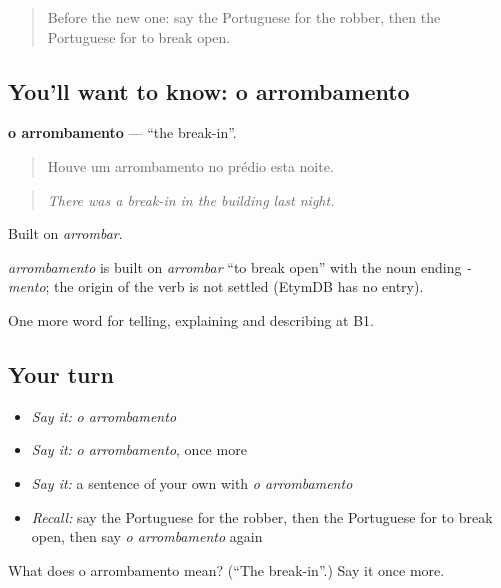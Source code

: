 \label{lesson:PT-C288-arrombamento}



\begin{quote}
Before the new one: say the Portuguese for the robber, then the Portuguese for to break open.
\end{quote}

\subsection*{You'll want to know: o arrombamento}
\textbf{o arrombamento} — \textquotedblleft{}the break-in\textquotedblright{}.

\begin{quote}
Houve um arrombamento no prédio esta noite.
\end{quote}

\begin{quote}
\emph{There was a break-in in the building last night.}
\end{quote}

Built on \emph{arrombar}.

\begin{cousinweb}
\emph{arrombamento} is built on \emph{arrombar} \textquotedblleft{}to break open\textquotedblright{} with the noun ending \emph{-mento}; the origin of the verb is not settled (EtymDB has no entry).
\end{cousinweb}

\begin{grammarlens}[title={What you've built}]
One more word for telling, explaining and describing at B1.
\end{grammarlens}

\subsection*{Your turn}
\begin{itemize}
\raggedright
  \item \emph{Say it:} \emph{o arrombamento}
  \item \emph{Say it:} \emph{o arrombamento}, once more
  \item \emph{Say it:} a sentence of your own with \emph{o arrombamento}
  \item \emph{Recall:} say the Portuguese for the robber, then the Portuguese for to break open, then say \emph{o arrombamento} again
\end{itemize}

\begin{tcolorbox}[breakable,colback=teal!4,colframe=teal!35!black,title={Before you move on}]
What does o arrombamento mean? (\textquotedblleft{}The break-in\textquotedblright{}.) Say it once more.
\end{tcolorbox}
